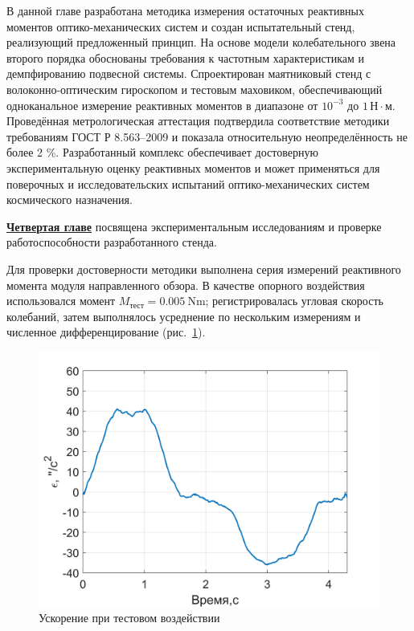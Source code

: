 В данной главе разработана методика измерения остаточных реактивных моментов оптико-механических систем и создан испытательный стенд, реализующий предложенный принцип.
На основе модели колебательного звена второго порядка обоснованы требования к частотным характеристикам и демпфированию подвесной системы.
Спроектирован маятниковый стенд с волоконно-оптическим гироскопом и тестовым маховиком, обеспечивающий одноканальное измерение реактивных моментов в диапазоне от $10^{-3}$ до $1\,\text{Н}\cdot\text{м}$. Проведённая метрологическая аттестация подтвердила соответствие методики требованиям ГОСТ Р 8.563–2009 и показала относительную неопределённость не более 2 \%. Разработанный комплекс обеспечивает достоверную экспериментальную оценку реактивных моментов и может применяться для поверочных и исследовательских испытаний оптико-механических систем космического назначения.

\underline{\textbf{Четвертая главе}} посвящена экспериментальным исследованиям и проверке работоспособности разработанного стенда.

Для проверки достоверности методики выполнена серия измерений реактивного момента модуля направленного обзора.
В качестве опорного воздействия использовался момент $M_{\text{тест}}=\SI{0.005}{\newton\meter}$;
регистрировалась угловая скорость колебаний, затем выполнялось усреднение по нескольким измерениям и численное дифференцирование (рис.~\cref{fig:test-gyro-acc}).

\begin{figure}[h!]
	\centering
	\includegraphics[scale=0.35]{matlab/img/test-gyro-acc}
	\caption{Ускорение при тестовом воздействии}
	\label{fig:test-gyro-acc}
\end{figure}

